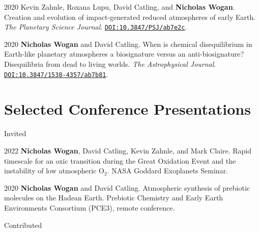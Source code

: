 \documentclass{article}
\begin{document}
\begin{cvlist}
\item[2020]
  Kevin Zahnle, Roxana Lupu, David Catling, and \textbf{Nicholas Wogan}. Creation and evolution of impact-generated reduced atmospheres of early Earth. \emph{The Planetary Science Journal}. \href{https://doi.org/10.3847/PSJ/ab7e2c}{\nolinkurl{DOI:10.3847/PSJ/ab7e2c}}.
\item[2020]
  \textbf{Nicholas Wogan} and David Catling. When is chemical disequilibrium in Earth-like planetary atmospheres a biosignature versus an anti-biosignature? Disequilibria from dead to living worlds. \emph{The Astrophysical Journal}. \href{https://doi.org/10.3847/1538-4357/ab7b81}{\nolinkurl{DOI:10.3847/1538-4357/ab7b81}}.
\end{cvlist}

\section{Selected Conference Presentations}

\noindent Invited

\begin{cvlist}
\item[2022]
  \textbf{Nicholas Wogan}, David Catling, Kevin Zahnle, and Mark Claire. Rapid timescale for an oxic transition during the Great Oxidation Event and the instability of low atmospheric O$_2$. NASA Goddard Exoplanets Seminar.
\item[2020] 
  \textbf{Nicholas Wogan} and David Catling. Atmospheric synthesis of prebiotic molecules on the Hadean Earth. Prebiotic Chemistry and Early Earth Environments Consortium (PCE3), remote conference.
\end{cvlist}

\noindent Contributed
\end{document}

